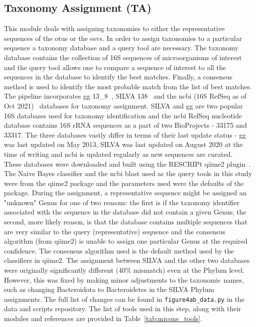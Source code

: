   \subsection*{Taxonomy Assignment (TA)}
  \vspace{-5mm}
  This module deals with assigning taxonomies to either the representative sequences of the \ac{otu}s or the \ac{esv}s.
  In order to assign taxonomies to a particular sequence a taxonomy database and a query tool are necessary.
  The taxonomy database contains the collection of 16S sequences of microorganisms of interest and the query tool allows one to compare a sequence of interest to all the sequences in the database to identify the best matches.
  Finally, a consensus method is used to identify the most probable match from the list of best matches.
  The pipeline incorporates \ac{gg} 13\_8~\cite{DeSantis2006}, SILVA 138~\cite{Quast2012} and the \ac{ncbi} (16S RefSeq as of Oct 2021)~\cite{Sayers2009} databases for taxonomy assignment.
  SILVA and \ac{gg} are two popular 16S databases used for taxonomy identification and the \ac{ncbi} RefSeq nucleotide database contains 16S rRNA sequences as a part of two BioProjects - 33175 and 33317.
  The three databases vastly differ in terms of their last update status - \ac{gg} was last updated on May 2013, SILVA was last updated on August 2020 at the time of writing and \ac{ncbi} is updated regularly as new sequences are curated.
  These databases were downloaded and built using the RESCRIPt \ac{qiime2} plugin~\cite{iiRESCRIPtReproducibleSequence2021}.
  The Naive Bayes classifier and the \ac{ncbi} blast used as the query tools in this study were from the \ac{qiime2} package and the parameters used were the defaults of the package.
  During the assignment, a representative sequence might be assigned an "unknown" Genus for one of two reasons: the first is if the taxonomy identifier associated with the sequence in the database did not contain a given Genus; the second, more likely reason, is that the database contains multiple sequences that are very similar to the query (representative) sequence and the consensus algorithm (from \ac{qiime2}) is unable to assign one particular Genus at the required confidence.
  The consensus algorithm used is the default method used by the classifiers in \ac{qiime2}.
  The assignment between SILVA and the other two databases were originally significantly different ($40\%$ mismatch) even at the Phylum level.
  However, this was fixed by making minor adjustments to the taxonomic names, such as changing Bacteroidota to Bacteroidetes in the SILVA Phylum assignments.
  The full list of changes can be found in \texttt{figure4ab\_data.py} in the data and scripts  repository.
  The list of tools used in this step, along with their modules and references are provided in Table~\ref{tab:micone_tools}.

